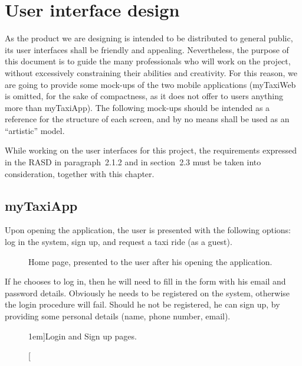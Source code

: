 \chapter{User interface design} \label{chap:userinterface}
As the product we are designing is intended to be distributed to general public, its user interfaces shall be friendly and appealing. Nevertheless, the purpose of this document is to guide the many professionals who will work on the project, without excessively constraining their abilities and creativity. For this reason, we are going to provide some mock-ups of the two mobile applications (myTaxiWeb is omitted, for the sake of compactness, as it does not offer to users anything more than myTaxiApp). The following mock-ups should be intended as a reference for the structure of each screen, and by no means shall be used as an ``artistic'' model.

While working on the user interfaces for this project, the requirements expressed in the RASD in paragraph~2.1.2 and in section~2.3 must be taken into consideration, together with this chapter.


\section{myTaxiApp}
Upon opening the application, the user is presented with the following options: log in the system, sign up, and request a taxi ride (as a guest).

\begin{figure}%
	\hfill%
	\hfill%
	\caption{Home page, presented to the user after his opening the application.}\label{fig:firstPage}
\end{figure}

\newpage 

If he chooses to log in, then he will need to fill in the form with his email and password details. Obviously he needs to be registered on the system, otherwise the login procedure will fail. Should he not be registered, he can sign up, by providing some personal details (name, phone number, email).

\begin{figure}%
	\hfill%
	\hfill%
	\hfill%
	\caption[][1em]{Login and Sign up pages.}\label{fig:loginSignup}
\end{figure}

